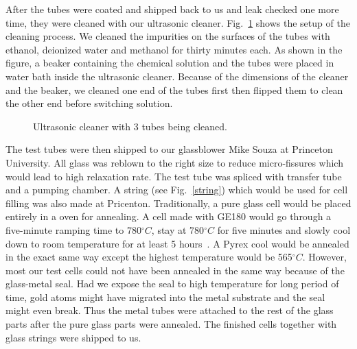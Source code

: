 After the tubes were coated and shipped back to us and leak checked one more time, they were cleaned with our ultrasonic cleaner. Fig.~\ref{ultrasonic_cleaner} shows the setup of the cleaning process. We cleaned the impurities on the surfaces of the tubes with ethanol, deionized water and methanol for thirty minutes each. As shown in the figure, a beaker containing the chemical solution and the tubes were placed in water bath inside the ultrasonic cleaner. Because of the dimensions of the cleaner and the beaker, we cleaned one end of the tubes first then flipped them to clean the other end before switching solution.

\begin{figure}[H]
	\centering
	\caption{{Ultrasonic cleaner with 3 tubes being cleaned.}}
	\label{ultrasonic_cleaner}
\end{figure}

The test tubes were then shipped to our glassblower Mike Souza at Princeton University. All glass was reblown to the right size to reduce micro-fissures which would lead to high relaxation rate. The test tube was spliced with transfer tube and a pumping chamber. A string (see Fig.~\ref{string}) which would be used for cell filling was also made at Pricenton. Traditionally, a pure glass cell would be placed entirely in a oven for annealing. A cell made with GE180 would go through a five-minute ramping time to 780$^{\circ}C$, stay at 780$^{\circ}C$ for five minutes and slowly cool down to room temperature for at least 5 hours~\cite{DanThesis}. A Pyrex cool would be annealed in the exact same way except the highest temperature would be 565$^{\circ}C$. However, most our test cells could not have been annealed in the same way because of the glass-metal seal. Had we expose the seal to high temperature for long period of time, gold atoms might have migrated into the metal substrate and the seal might even break. Thus the metal tubes were attached to the rest of the glass parts after the pure glass parts were annealed. The finished cells together with glass strings were shipped to us.

